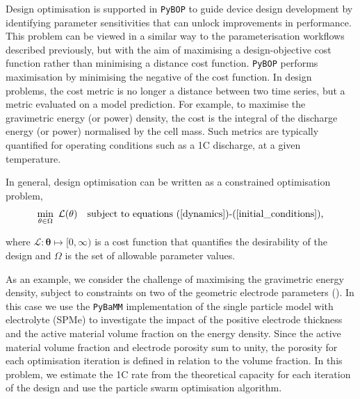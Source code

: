 \documentclass[
]{article}
\begin{document}
Design optimisation is supported in \texttt{PyBOP} to guide device
design development by identifying parameter sensitivities that can
unlock improvements in performance. This problem can be viewed in a
similar way to the parameterisation workflows described previously, but
with the aim of maximising a design-objective cost function rather than
minimising a distance cost function. \texttt{PyBOP} performs
maximisation by minimising the negative of the cost function. In design
problems, the cost metric is no longer a distance between two time
series, but a metric evaluated on a model prediction. For example, to
maximise the gravimetric energy (or power) density, the cost is the
integral of the discharge energy (or power) normalised by the cell mass.
Such metrics are typically quantified for operating conditions such as a
1C discharge, at a given temperature.

In general, design optimisation can be written as a constrained
optimisation problem, \begin{equation}
\min_{\mathbf{\theta} \in \Omega} ~ \mathcal{L}(\mathbf{\theta}) ~~~
\textrm{subject to equations (\ref{dynamics})\textrm{-}(\ref{initial_conditions}),}
\label{eqn:design}
\end{equation}

where \(\mathcal{L} : \mathbf{\theta} \mapsto [0,\infty)\) is a cost
function that quantifies the desirability of the design and \(\Omega\)
is the set of allowable parameter values.

As an example, we consider the challenge of maximising the gravimetric
energy density, subject to constraints on two of the geometric electrode
parameters (). In this case
we use the \texttt{PyBaMM} implementation of the single particle model
with electrolyte (SPMe) to investigate the impact of the positive
electrode thickness and the active material volume fraction on the
energy density. Since the active material volume fraction and electrode
porosity sum to unity, the porosity for each optimisation iteration is
defined in relation to the volume fraction. In this problem, we estimate
the 1C rate from the theoretical capacity for each iteration of the
design and use the particle swarm optimisation algorithm.
\end{document}
